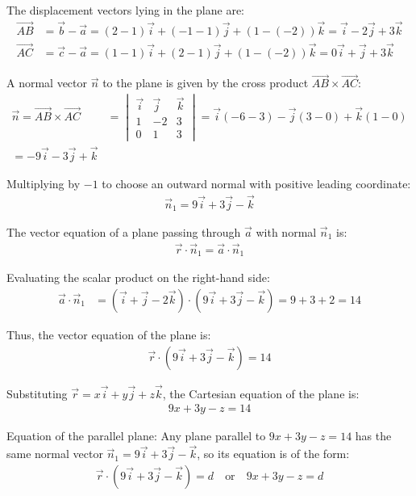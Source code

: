\begin{enumerate}[label=\thesubsection.\arabic*, ref=\thesubsection.\theenumi]
The displacement vectors lying in the plane are:
\begin{align*}
	\vec{AB} &= \vec{b} - \vec{a} = (2 - 1)\vec{i} + (-1 - 1)\vec{j} + (1 - (-2))\vec{k} = \vec{i} - 2\vec{j} + 3\vec{k} \\
	\vec{AC} &= \vec{c} - \vec{a} = (1 - 1)\vec{i} + (2 - 1)\vec{j} + (1 - (-2))\vec{k} = 0\vec{i} + \vec{j} + 3\vec{k}
\end{align*}

A normal vector $\vec{n}$ to the plane is given by the cross product $\vec{AB} \times \vec{AC}$:
\begin{align*}
	\vec{n} = \vec{AB} \times \vec{AC} &= \begin{vmatrix}
		\vec{i} & \vec{j} & \vec{k} \\
		1 & -2 & 3 \\
		0 & 1 & 3
	\end{vmatrix} 	
	= \vec{i}(-6 - 3) - \vec{j}(3 - 0) + \vec{k}(1 - 0) \\
	= -9\vec{i} - 3\vec{j} + \vec{k}
\end{align*}

Multiplying by $-1$ to choose an outward normal with positive leading coordinate:
\begin{align*}
	\vec{n}_1 = 9\vec{i} + 3\vec{j} - \vec{k}
\end{align*}

The vector equation of a plane passing through $\vec{a}$ with normal $\vec{n}_1$ is:
\begin{align*}
	\vec{r} \cdot \vec{n}_1 = \vec{a} \cdot \vec{n}_1
\end{align*}

Evaluating the scalar product on the right-hand side:
\begin{align*}
	\vec{a} \cdot \vec{n}_1 &= (\vec{i} + \vec{j} - 2\vec{k}) \cdot (9\vec{i} + 3\vec{j} - \vec{k}) 
	= 9 + 3 + 2 = 14
\end{align*}

Thus, the vector equation of the plane is:
\begin{align*}
	\vec{r} \cdot (9\vec{i} + 3\vec{j} - \vec{k}) = 14
\end{align*}

Substituting $\vec{r} = x\vec{i} + y\vec{j} + z\vec{k}$, the Cartesian equation of the plane is:
\begin{align*}
	9x + 3y - z = 14 
\end{align*}

Equation of the parallel plane:
Any plane parallel to $9x + 3y - z = 14$ has the same normal vector $\vec{n}_1 = 9\vec{i} + 3\vec{j} - \vec{k}$, so its equation is of the form:
\begin{align*}
	\vec{r} \cdot (9\vec{i} + 3\vec{j} - \vec{k}) = d \quad \text{or} \quad 9x + 3y - z = d
\end{align*}


\end{enumerate}

